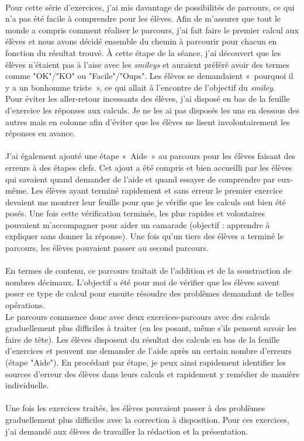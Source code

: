 \paragraph{}Pour cette série d'exercices, j'ai mis davantage de possibilités de parcours, ce qui n'a pas été facile à comprendre pour les élèves. Afin de m'assurer que tout le monde a compris comment réaliser le parcours, j'ai fait faire le premier calcul aux élèves et nous avons décidé ensemble du chemin à parcourir pour chacun en fonction du résultat trouvé. À cette étape de la séance, j'ai découvert que les élèves n'étaient pas à l'aise avec les \textit{smileys} et auraient préféré avoir des termes comme "OK"/"KO" ou "Facile"/"Oups". Les élèves se demandaient « pourquoi il y a un bonhomme triste », ce qui allait à l'encontre de l'objectif du \textit{smiley}.\\
Pour éviter les aller-retour incessants des élèves, j'ai disposé en bas de la feuille d'exercice les réponses aux calculs. Je ne les ai pas disposés les uns en dessous des autres mais en colonne afin d'éviter que les élèves ne lisent involontairement les réponses en avance.
\paragraph{}J'ai également ajouté une étape « Aide » au parcours pour les élèves faisant des erreurs à des étapes clefs. Cet ajout a été compris et bien accueilli par les élèves qui savaient quand demander de l'aide et quand essayer de comprendre par eux-même. Les élèves ayant terminé rapidement et sans erreur le premier exercice devaient me montrer leur feuille pour que je vérifie que les calculs ont bien été posés. Une fois cette vérification terminée, les plus rapides et volontaires pouvaient m'accompagner pour aider un camarade (objectif : apprendre à expliquer sans donner la réponse). Une fois qu'un tiers des élèves a terminé le parcours, les élèves pouvaient passer au second parcours.
\paragraph{} En termes de contenu, ce parcours traitait de l'addition et de la soustraction de nombres décimaux. L'objectif a été pour moi de vérifier que les élèves savent poser ce type de calcul pour ensuite résoudre des problèmes demandant de telles opérations.\\
Le parcours commence donc avec deux exercices-parcours avec des calculs graduellement plus difficiles à traiter (en les posant, même s'ils pensent savoir les faire de tête). Les élèves disposent du résultat des calculs en bas de la feuille d'exercices et peuvent me demander de l'aide après un certain nombre d'erreurs (étape "Aide"). En procédant par étape, je peux ainsi rapidement identifier les sources d'erreur des élèves dans leurs calculs et rapidement y remédier de manière individuelle.\\
\\
Une fois les exercices traités, les élèves pouvaient passer à des problèmes graduellement plus difficiles avec la correction à disposition. Pour ces exercices, j'ai demandé aux élèves de travailler la rédaction et la présentation.


